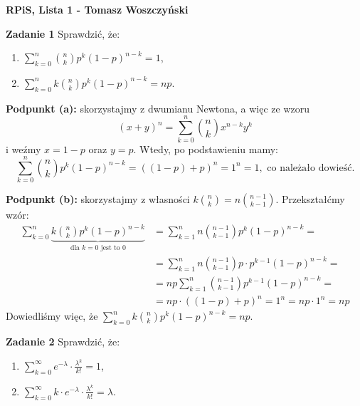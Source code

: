 \documentclass[a4paper,12pt]{article}
\begin{document}
\noindent \textbf{RPiS, Lista 1 - Tomasz Woszczyński}\newline

\noindent \newline \textbf{Zadanie 1} \newline
Sprawdzić, że:
\begin{enumerate}[label=(\alph*)]
    \item $\sum\limits_{k=0}^{n} \binom{n}{k} p^k (1-p)^{n-k} = 1$,
    \item $\sum\limits_{k=0}^{n} k \binom{n}{k} p^k (1-p)^{n-k} = np$.
\end{enumerate}

\noindent \textbf{Podpunkt (a):} skorzystajmy z dwumianu Newtona, a więc ze wzoru
\[
    (x+y)^n = \sum\limits_{k=0}^{n} \binom{n}{k} x^{n-k}y^{k}    
\]
i weźmy $x = 1-p$ oraz $y = p$. Wtedy, po podstawieniu mamy:
\[
    \sum\limits_{k=0}^{n} \binom{n}{k} p^k (1-p)^{n-k} 
    = \left( \left( 1 - p \right) + p \right)^n = 1^n = 1,
    \text{ co należało dowieść.} 
\]

\noindent \textbf{Podpunkt (b):} skorzystajmy z własności 
$k \binom{n}{k} = n \binom{n-1}{k-1}$. Przekształćmy wzór:
\begin{align*}
    \sum\limits_{k=0}^{n} \underbrace{k \binom{n}{k} p^k (1-p)^{n-k}}
    _{\text{dla } k = 0 \text{ jest to } 0} &=
    \sum\limits_{k=1}^{n} n \binom{n-1}{k-1} p^k (1-p)^{n-k} = \\
    &= \sum\limits_{k=1}^{n} n \binom{n-1}{k-1} p \cdot p^{k-1} (1-p)^{n-k} = \\
    &= np \sum\limits_{k=1}^{n} \binom{n-1}{k-1} p^{k-1} (1-p)^{n-k} = \\
    &= np \cdot \left( \left( 1 - p \right) + p \right)^n = 1^n = np \cdot 1^n = np
\end{align*}
Dowiedliśmy więc, że $\sum\limits_{k=0}^{n} k \binom{n}{k} p^k (1-p)^{n-k} = np$.

\noindent \newline \textbf{Zadanie 2} \newline
Sprawdzić, że:
\begin{enumerate}[label=(\alph*)]
    \item $\sum\limits_{k=0}^{\infty} e^{-\lambda} \cdot \frac{\lambda^k}{k!} = 1$,
    \item $\sum\limits_{k=0}^{\infty} k \cdot e^{-\lambda} \cdot \frac{\lambda^k}{k!} = \lambda$.
\end{enumerate}
\end{document}
